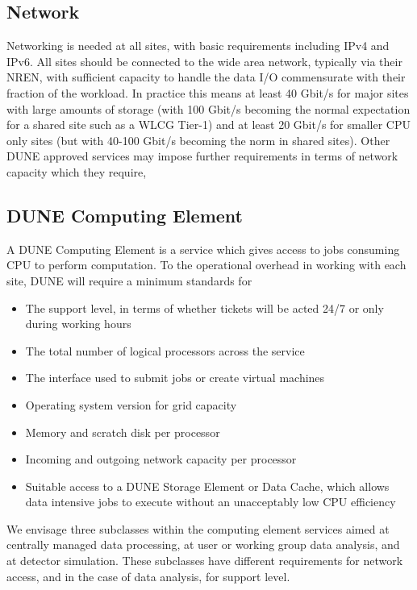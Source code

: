 \documentclass[../main-v1.tex]{subfiles}
\begin{document}
\subsection{Network}
\label{sec:cm:network}

Networking is needed at all sites, with basic requirements including IPv4 and IPv6.
All sites should be connected to the wide area network, typically via their NREN, with sufficient capacity to handle the data I/O commensurate with their fraction of the workload. In practice this means at least 40 Gbit/s for major sites with large amounts of storage (with 100 Gbit/s becoming the normal expectation for a shared site such as a WLCG Tier-1) and at least 20 Gbit/s for smaller CPU only sites (but with 40-100 Gbit/s becoming the norm in shared sites).
Other DUNE approved services may impose further requirements in terms of network capacity which they require,

\subsection{DUNE Computing Element}
\label{sec:cm:dce}

A DUNE Computing Element is a service which gives access to jobs consuming CPU to perform computation. To the operational overhead in working with each site, DUNE will require a minimum standards for

\begin{itemize}
    \item The support level, in terms of whether tickets will be acted 24/7 or only during working hours
    \item The total number of logical processors across the service
    \item The interface used to submit jobs or create virtual machines
    \item Operating system version for grid capacity
    \item Memory and scratch disk per processor
    \item Incoming and outgoing network capacity per processor
    \item Suitable access to a DUNE Storage Element or Data Cache, which allows data intensive jobs to execute without an unacceptably low CPU efficiency
\end{itemize}

We envisage three subclasses within the computing element services aimed at centrally managed data processing, at user or working group data analysis, and at detector simulation. These subclasses have different requirements for network access, and in the case of data analysis, for support level.
\end{document}
